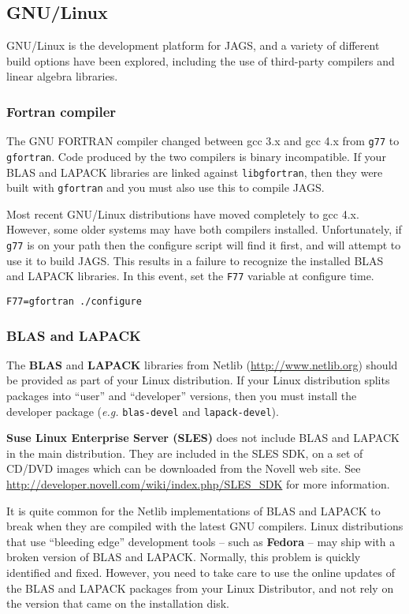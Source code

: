 \documentclass[11pt, a4paper, titlepage]{article}
\newcommand{\JAGS}{\textsf{JAGS}}
\begin{document}
\subsection{GNU/Linux}
\label{section:gnulinux}

GNU/Linux is the development platform for \JAGS, and a variety of
different build options have been explored, including the use of
third-party compilers and linear algebra libraries.

\subsubsection{Fortran compiler}

The GNU FORTRAN compiler changed between gcc 3.x and gcc 4.x from
\verb+g77+ to \verb+gfortran+. Code produced by the two compilers is
binary incompatible. If your BLAS and LAPACK libraries are linked
against \verb+libgfortran+, then they were built with \verb+gfortran+
and you must also use this to compile \JAGS. 

Most recent GNU/Linux distributions have moved completely to gcc 4.x.
However, some older systems may have both compilers installed.
Unfortunately, if \verb+g77+ is on your path then the configure script
will find it first, and will attempt to use it to build \JAGS. This
results in a failure to recognize the installed BLAS and LAPACK
libraries. In this event, set the \verb+F77+ variable at configure time.
\begin{verbatim}
F77=gfortran ./configure
\end{verbatim}

\subsubsection{BLAS and LAPACK}

The {\bf BLAS} and {\bf LAPACK} libraries from Netlib
(\url{http://www.netlib.org}) should be provided as part of your Linux
distribution. If your Linux distribution splits packages into ``user''
and ``developer'' versions, then you must install the developer
package ({\em e.g.}  \texttt{blas-devel} and \texttt{lapack-devel}).

{\bf Suse Linux Enterprise Server (SLES)} does not include BLAS and
LAPACK in the main distribution. They are included in the SLES SDK, on
a set of CD/DVD images which can be downloaded from the Novell web
site.  See \url{http://developer.novell.com/wiki/index.php/SLES_SDK}
for more information.

It is quite common for the Netlib implementations of BLAS and LAPACK
to break when they are compiled with the latest GNU compilers.  Linux
distributions that use ``bleeding edge'' development tools -- such as
{\bf Fedora} -- may ship with a broken version of BLAS and
LAPACK. Normally, this problem is quickly identified and
fixed. However, you need to take care to use the online updates of the
BLAS and LAPACK packages from your Linux Distributor, and not rely on
the version that came on the installation disk.
\end{document}
